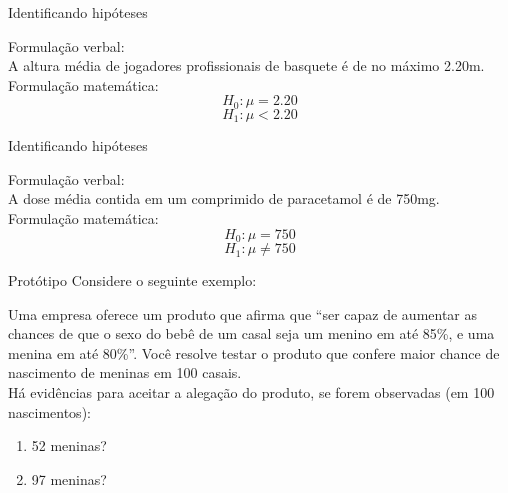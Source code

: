 \documentclass{beamer}
\begin{document}
\begin{frame}{Identificando hipóteses}
  \begin{example}
    Formulação verbal:\\
    A altura média de jogadores profissionais de basquete é de no
    máximo 2.20m.\\
    \bigskip
    Formulação matemática:\\
    \begin{displaymath}
      H_0: \mu = 2.20
    \end{displaymath}
    \begin{displaymath}
      H_1: \mu < 2.20
    \end{displaymath}
  \end{example}
\end{frame}

\begin{frame}{Identificando hipóteses}
  \begin{example}
    Formulação verbal:\\
    A dose média contida em um comprimido de paracetamol é de 750mg.\\
    \bigskip
    Formulação matemática:\\
    \begin{displaymath}
      H_0: \mu = 750
    \end{displaymath}
    \begin{displaymath}
      H_1: \mu \ne 750
    \end{displaymath}
  \end{example}
\end{frame}


\begin{frame}{Protótipo}
  Considere o seguinte exemplo:
  \begin{example}
    Uma empresa oferece um produto que afirma que ``ser capaz de
    aumentar as chances de que o sexo do bebê de um casal seja um
    menino em até 85\%, e uma menina em até 80\%''. Você resolve
    testar o produto que
    confere maior chance de nascimento de meninas em 100 casais.\\
    \bigskip Há evidências para aceitar a alegação do produto, se
    forem observadas (em 100 nascimentos):
    \begin{enumerate}
    \item 52 meninas?
    \item 97 meninas?
    \end{enumerate}
  \end{example}
\end{frame}
\end{document}
